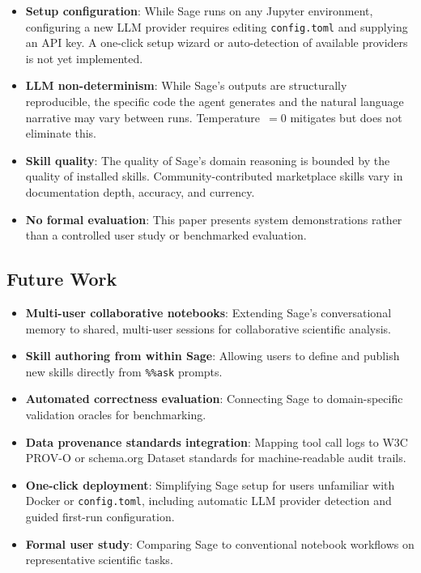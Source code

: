 \documentclass[10pt,twocolumn]{article}
\begin{document}
\begin{itemize}
  \item \textbf{Setup configuration}: While Sage runs on any Jupyter environment, configuring a new LLM provider requires editing \texttt{config.toml} and supplying an API key. A one-click setup wizard or auto-detection of available providers is not yet implemented.
  \item \textbf{LLM non-determinism}: While Sage's outputs are structurally reproducible, the specific code the agent generates and the natural language narrative may vary between runs. Temperature~$= 0$ mitigates but does not eliminate this.
  \item \textbf{Skill quality}: The quality of Sage's domain reasoning is bounded by the quality of installed skills. Community-contributed marketplace skills vary in documentation depth, accuracy, and currency.
  \item \textbf{No formal evaluation}: This paper presents system demonstrations rather than a controlled user study or benchmarked evaluation.
\end{itemize}

\subsection{Future Work}

\begin{itemize}
  \item \textbf{Multi-user collaborative notebooks}: Extending Sage's conversational memory to shared, multi-user sessions for collaborative scientific analysis.
  \item \textbf{Skill authoring from within Sage}: Allowing users to define and publish new skills directly from \texttt{\%\%ask} prompts.
  \item \textbf{Automated correctness evaluation}: Connecting Sage to domain-specific validation oracles for benchmarking.
  \item \textbf{Data provenance standards integration}: Mapping tool call logs to W3C PROV-O or schema.org Dataset standards for machine-readable audit trails.
  \item \textbf{One-click deployment}: Simplifying Sage setup for users unfamiliar with Docker or \texttt{config.toml}, including automatic LLM provider detection and guided first-run configuration.
  \item \textbf{Formal user study}: Comparing Sage to conventional notebook workflows on representative scientific tasks.
\end{itemize}
\end{document}
